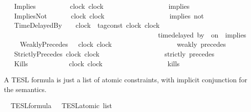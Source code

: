 \begin{isabellebody}
\ \ {\isacharbar}\ Implies\ \ \ \ \ \ \ \ \ \ {\isacartoucheopen}clock{\isacartoucheclose}\ {\isacartoucheopen}clock{\isacartoucheclose}\ \ \ \ \ \ \ \ \ \ \ \ \ \ \ \ \ \ {\isacharparenleft}\ {\isachardoublequoteopen}implies{\isachardoublequoteclose}\ {}{}{\isacharparenright}\isanewline
\ \ {\isacharbar}\ ImpliesNot\ \ \ \ \ \ \ {\isacartoucheopen}clock{\isacartoucheclose}\ {\isacartoucheopen}clock{\isacartoucheclose}\ \ \ \ \ \ \ \ \ \ \ \ \ \ \ \ \ \ {\isacharparenleft}\ {\isachardoublequoteopen}implies\ not{\isachardoublequoteclose}\ {}{}{\isacharparenright}\isanewline
\ \ {\isacharbar}\ TimeDelayedBy\ \ \ \ {\isacartoucheopen}clock{\isacartoucheclose}\ {\isacartoucheopen}{\isacharprime}{\isasymtau}\ tag{\isacharunderscore}const{\isacartoucheclose}\ {\isacartoucheopen}clock{\isacartoucheclose}\ {\isacartoucheopen}clock{\isacartoucheclose}\ \isanewline
\ \ \ \ \ \ \ \ \ \ \ \ \ \ \ \ \ \ \ \ \ \ \ \ \ \ \ \ \ \ \ \ \ \ \ \ \ \ \ \ \ \ \ \ {\isacharparenleft}{\isachardoublequoteopen}{\isacharunderscore}\ time{\isacharminus}delayed\ by\ {\isacharunderscore}\ on\ {\isacharunderscore}\ implies\ {\isacharunderscore}{\isachardoublequoteclose}\ {}{}{\isacharparenright}\isanewline
\ \ {\isacharbar}\ WeaklyPrecedes\ \ \ {\isacartoucheopen}clock{\isacartoucheclose}\ {\isacartoucheopen}clock{\isacartoucheclose}\ \ \ \ \ \ \ \ \ \ \ \ \ \ \ \ \ \ {\isacharparenleft}\ {\isachardoublequoteopen}weakly\ precedes{\isachardoublequoteclose}\ {}{}{\isacharparenright}\isanewline
\ \ {\isacharbar}\ StrictlyPrecedes\ {\isacartoucheopen}clock{\isacartoucheclose}\ {\isacartoucheopen}clock{\isacartoucheclose}\ \ \ \ \ \ \ \ \ \ \ \ \ \ \ \ \ \ {\isacharparenleft}\ {\isachardoublequoteopen}strictly\ precedes{\isachardoublequoteclose}\ {}{}{\isacharparenright}\isanewline
\ \ {\isacharbar}\ Kills\ \ \ \ \ \ \ \ \ \ \ \ {\isacartoucheopen}clock{\isacartoucheclose}\ {\isacartoucheopen}clock{\isacartoucheclose}\ \ \ \ \ \ \ \ \ \ \ \ \ \ \ \ \ \ {\isacharparenleft}\ {\isachardoublequoteopen}kills{\isachardoublequoteclose}\ {}{}{\isacharparenright}%
\begin{isamarkuptext}%
A TESL formula is just a list of atomic constraints, with implicit conjunction
  for the semantics.%
\end{isamarkuptext}\isamarkuptrue%
\isamarkupfalse%
\ {\isacharprime}{\isasymtau}\ TESL{\isacharunderscore}formula\ {\isacharequal}\ {\isacartoucheopen}{\isacharprime}{\isasymtau}\ TESL{\isacharunderscore}atomic\ list{\isacartoucheclose}%

\end{isabellebody}
